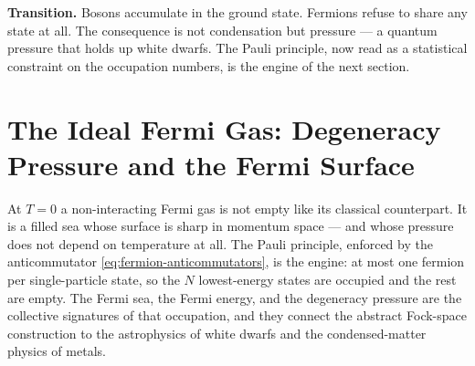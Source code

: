 \medskip\noindent\textbf{Transition.}
Bosons accumulate in the ground state. Fermions refuse to share any state at all. The consequence is not condensation but pressure --- a quantum pressure that holds up white dwarfs. The Pauli principle, now read as a statistical constraint on the occupation numbers, is the engine of the next section.

\section{The Ideal Fermi Gas: Degeneracy Pressure and the Fermi Surface}
\label{sec:fermi-gas}

At $T = 0$ a non-interacting Fermi gas is not empty like its classical counterpart. It is a filled sea whose surface is sharp in momentum space --- and whose pressure does not depend on temperature at all. The Pauli principle, enforced by the anticommutator \eqref{eq:fermion-anticommutators}, is the engine: at most one fermion per single-particle state, so the $N$ lowest-energy states are occupied and the rest are empty. The Fermi sea, the Fermi energy, and the degeneracy pressure are the collective signatures of that occupation, and they connect the abstract Fock-space construction to the astrophysics of white dwarfs and the condensed-matter physics of metals.

